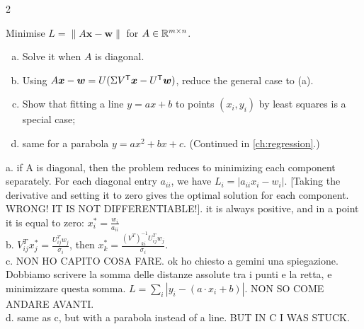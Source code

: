 \begin{paracol}{2}
\begin{exercise}
Minimise $L=\|A\bm x-\bm w\|$ for $A\in\mathbb{R}^{m\times n}$.
\begin{enumerate}[(a)]
  \item Solve it when $A$ is diagonal.
  \item Using
      $A\bm x-\bm w=U(\Sigma V^{\mathsf T}\bm x-U^{\mathsf T}\bm w)$, reduce the general case to (a).
  \item Show that fitting a line $y=ax+b$ to
      points $(x_i,y_i)$ by least squares is a special case;
  \item same for a parabola $y=ax^2+bx+c$.
      (Continued in \cref{ch:regression}.)
\end{enumerate}
\end{exercise}
\begin{mysolution}
  a. if A is diagonal, then the problem reduces to minimizing each component separately. For each diagonal entry $a_{ii}$, we have $L_i = |a_{ii} x_i - w_i|$. [Taking the derivative and setting it to zero gives the optimal solution for each component. WRONG! IT IS NOT DIFFERENTIABLE!]. it is always positive, and in a point it is equal to zero: $x_i^* = \frac{w_i}{a_{ii}}$ \\
  b. $V^T_{ij} x^*_j = \frac{U^T_{ij} w_j}{\sigma_i}$, then $x^*_k = \frac{(V^T)^{-1}_{ki} U^T_{ij} w_j}{\sigma_i}$. \\
  c. NON HO CAPITO COSA FARE. ok ho chiesto a gemini una spiegazione. Dobbiamo scrivere la somma delle distanze assolute tra i punti e la retta, e minimizzare questa somma. $L= \sum_{i} |y_i - (a \cdot x_i + b)|$. NON SO COME ANDARE AVANTI. \\
  d. same as c, but with a parabola instead of a line. BUT IN C I WAS STUCK.


\end{mysolution}
\end{paracol}
